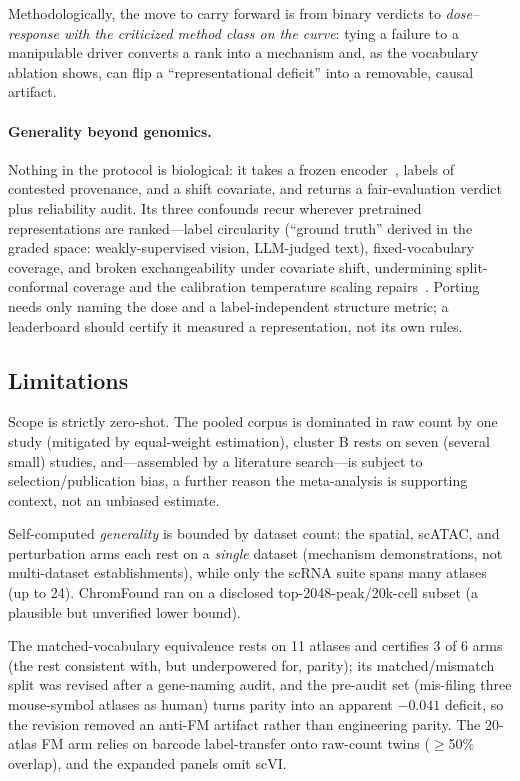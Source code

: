 \documentclass[journal]{IEEEtran}
\begin{document}
Methodologically, the move to carry forward is from binary verdicts to \emph{dose--response with the criticized method class on the curve}: tying a failure to a manipulable driver converts a rank into a mechanism and, as the vocabulary ablation shows, can flip a ``representational deficit'' into a removable, causal artifact.

\paragraph{Generality beyond genomics.} Nothing in the protocol is biological: it takes a frozen encoder~\cite{bommasani2021,vaswani2017}, labels of contested provenance, and a shift covariate, and returns a fair-evaluation verdict plus reliability audit. Its three confounds recur wherever pretrained representations are ranked---label circularity (``ground truth'' derived in the graded space: weakly-supervised vision, LLM-judged text), fixed-vocabulary coverage, and broken exchangeability under covariate shift, undermining split-conformal coverage and the calibration temperature scaling repairs~\cite{vovk2005,angelopoulos2023,barber2023,guo2017}. Porting needs only naming the dose and a label-independent structure metric; a leaderboard should certify it measured a representation, not its own rules.

\subsection*{Limitations}
Scope is strictly zero-shot. The pooled corpus is dominated in raw count by one study (mitigated by equal-weight estimation), cluster B rests on seven (several small) studies, and---assembled by a literature search---is subject to selection/publication bias, a further reason the meta-analysis is supporting context, not an unbiased estimate.

Self-computed \emph{generality} is bounded by dataset count: the spatial, scATAC, and perturbation arms each rest on a \emph{single} dataset (mechanism demonstrations, not multi-dataset establishments), while only the scRNA suite spans many atlases (up to 24). ChromFound ran on a disclosed top-2048-peak/20k-cell subset (a plausible but unverified lower bound).

The matched-vocabulary equivalence rests on 11 atlases and certifies 3 of 6 arms (the rest consistent with, but underpowered for, parity); its matched/mismatch split was revised after a gene-naming audit, and the pre-audit set (mis-filing three mouse-symbol atlases as human) turns parity into an apparent $-0.041$ deficit, so the revision removed an anti-FM artifact rather than engineering parity. The 20-atlas FM arm relies on barcode label-transfer onto raw-count twins ($\geq$50\% overlap), and the expanded panels omit scVI.
\end{document}
